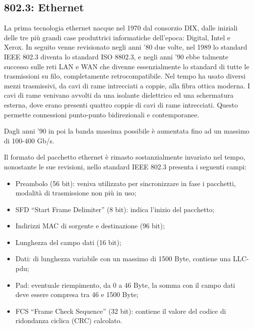 \documentclass{article}
\numberwithin{equation}{subsection}
\begin{document}

\subsection{802.3: Ethernet}
\label{sec:ieee_802.3}


La prima tecnologia ethernet nacque nel 1970 dal consorzio DIX, dalle iniziali delle tre più grandi case produttrici informatiche dell'epoca: Digital, Intel e Xerox. 
In seguito venne revisionato negli anni '80 due volte, nel 1989 lo standard IEEE 802.3 diventa lo standard ISO 8802.3, e negli anni '90 ebbe talmente successo sulle reti LAN e WAN che divenne essenzialmente lo 
standard di tutte le trasmissioni su filo, completamente retrocompatibile. 
Nel tempo ha usato diversi mezzi trasmissivi, da cavi di rame intrecciati a coppie, alla fibra ottica moderna. I cavi di rame venivano avvolti da una isolante dielettrico ed una schermatura esterna, dove erano 
presenti quattro coppie di cavi di rame intrecciati. Questo permette connessioni punto-punto bidirezionali e contemporanee. 

Dagli anni '90 in poi la banda massima possibile è aumentata fino ad un massimo di 100-400 Gb/s. 



Il formato del pacchetto ethernet è rimasto sostanzialmente invariato nel tempo, nonostante le sue revisioni, nello standard IEEE 802.3 presenta i seguenti campi:
\begin{itemize}
  \item Preambolo (56 bit): veniva utilizzato per sincronizzare in fase i pacchetti, modalità di trasmissione non più in uso;
  \item SFD ``Start Frame Delimiter'' (8 bit): indica l'inizio del pacchetto;
  \item Indirizzi MAC di sorgente e destinazione (96 bit);
  \item Lunghezza del campo dati (16 bit);
  \item Dati: di lunghezza variabile con un massimo di 1500 Byte, contiene una LLC-pdu;
  \item Pad: eventuale riempimento, da 0 a 46 Byte, la somma con il campo dati deve essere compresa tra 46 e 1500 Byte;
  \item FCS ``Frame Check Sequence'' (32 bit): contiene il valore del codice di ridondanza ciclica (CRC) calcolato. 
\end{itemize}
\end{document}
